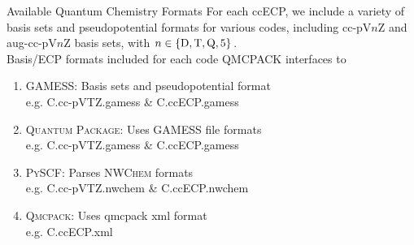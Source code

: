 \begin{frame}
\begin{columns}
\begin{column}
%
	\end{column}
    \end{columns}
\end{frame}

\begin{frame}
    {Available Quantum Chemistry Formats}
    For each ccECP, we include a variety of basis sets and pseudopotential formats for various codes, including cc-pV$n$Z and aug-cc-pV$n$Z basis sets, with $n \in \{\rm D,T,Q,5\}$.\\
    \bigskip
    Basis/ECP formats included for each code QMCPACK interfaces to
    \begin{enumerate}
        \item[] \textsc{\color{ForestGreen}GAMESS}: Basis sets and pseudopotential format\\
            {\hfil e.g. {\color{NavyBlue} C.cc-pVTZ.gamess \& C.ccECP.gamess}}
        \item[] \textsc{\color{Plum}Quantum Package}: Uses \textsc{GAMESS} file formats\\
            {\hfil e.g. {\color{NavyBlue} C.cc-pVTZ.gamess \& C.ccECP.gamess}}
        \item[] \textsc{\color{RedOrange}PySCF}: Parses \textsc{NWChem} formats\\
            {\hfil e.g. {\color{NavyBlue} C.cc-pVTZ.nwchem \& C.ccECP.nwchem}}
        \item[] \textsc{\color{wolfred}Qmcpack}: Uses qmcpack xml format\\
            {\hfil e.g. {\color{NavyBlue} C.ccECP.xml}}
    \end{enumerate}
\end{frame}

